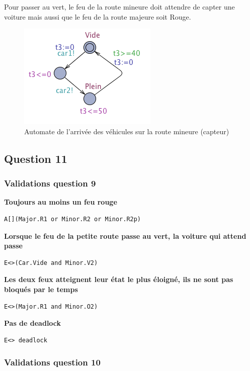 \documentclass[11pt]{article}
\begin{document}
Pour passer au vert, le feu de la route mineure doit attendre de capter une voiture mais aussi que le feu de la route majeure soit Rouge.

\begin{figure}[H]
	\centering
	\includegraphics{ressources/part3/Q10-3.png}
	\caption{Automate de l'arrivée des véhicules sur la route mineure (capteur)}
\end{figure}

\subsection{Question 11}

\subsubsection{Validations question 9}

\textbf{Toujours au moins un feu rouge}
\begin{verbatim}
A[](Major.R1 or Minor.R2 or Minor.R2p)
\end{verbatim}

\textbf{Lorsque le feu de la petite route passe au vert, la voiture qui attend passe}
\begin{verbatim}
E<>(Car.Vide and Minor.V2)
\end{verbatim}

\textbf{Les deux feux atteignent leur état le plus éloigné, ils ne sont pas bloqués par le temps}
\begin{verbatim}
E<>(Major.R1 and Minor.O2)
\end{verbatim}

\textbf{Pas de deadlock}
\begin{verbatim}
E<> deadlock
\end{verbatim}

\subsubsection{Validations question 10}
\end{document}
